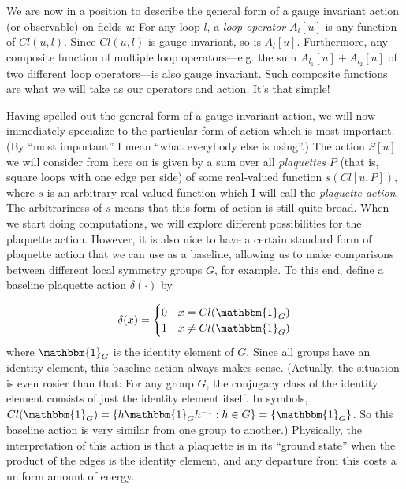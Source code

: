 \documentclass[9pt,twocolumn,twoside]{article}
\begin{document}
We are now in a position to describe the general form of a gauge invariant action (or observable) on fields $u$:  For any loop $l$, a \textit{loop operator} $A_l[u]$ is any function of $Cl(u,l)$.  Since $Cl(u,l)$ is gauge invariant, so is $A_l[u]$.  Furthermore, any composite function of multiple loop operators---e.g. the sum $A_{l_1}[u] + A_{l_2}[u]$ of two different loop operators---is also gauge invariant.  Such composite functions are what we will take as our operators and action.  It's that simple!

Having spelled out the general form of a gauge invariant action, we will now immediately specialize to the particular form of action which is most important.  (By ``most important'' I mean ``what everybody else is using''.)  The action $S[u]$ we will consider from here on is given by a sum over all \textit{plaquettes} $P$ (that is, square loops with one edge per side) of some real-valued function $s(Cl[u,P])$, where $s$ is an arbitrary real-valued function which I will call the \textit{plaquette action}.  The arbitrariness of $s$ means that this form of action is still quite broad.  When we start doing computations, we will explore different possibilities for the plaquette action.  However, it is also nice to have a certain standard form of plaquette action that we can use as a baseline, allowing us to make comparisons between different local symmetry groups $G$, for example.  To this end, define a baseline plaquette action $\delta(\cdot)$ by 

\begin{equation}
\delta(x) = 
\begin{cases}
0 & x = Cl(\mathbbm{1}_G) \\
1 & x \neq Cl(\mathbbm{1}_G) \\
\end{cases}
\end{equation}
where $\mathbbm{1}_G$ is the identity element of $G$.  Since all groups have an identity element, this baseline action always makes sense.  (Actually, the situation is even rosier than that: For any group $G$, the conjugacy class of the identity element consists of just the identity element itself.  In symbols, $Cl(\mathbbm{1}_G) = \{h\mathbbm{1}_G h^{-1} : h\in G\} = \{\mathbbm{1}_G\}$.  So this baseline action is very similar from one group to another.)  Physically, the interpretation of this action is that a plaquette is in its ``ground state'' when the product of the edges is the identity element, and any departure from this costs a uniform amount of energy.
\end{document}
